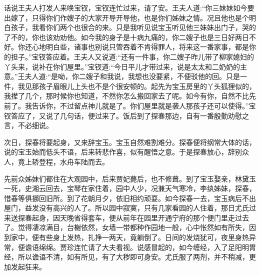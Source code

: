 


\begin{parag}
    话说王夫人打发人来唤宝钗，宝钗连忙过来，请了安。王夫人道:“你三妹妹如今要出嫁了，只得你们作嫂子的大家开导开导他，也是你们姊妹之情。况且他也是个明白孩子，我看你们两个也很合的来。只是我听见说宝玉听见他三妹妹出门子，哭的了不的，你也该劝劝他。如今我的身子是十病九痛的，你二嫂子也是三日好两日不好。你还心地明白些，诸事也别说只管吞着不肯得罪人，将来这一番家事，都是你的担子。”宝钗答应着。王夫人又说道:“还有一件事，你二嫂子昨儿带了柳家媳妇的丫头来，说补在你们屋里。”宝钗道:“今日平儿才带过来，说是太太和二奶奶的主意。”王夫人道:“是呦，你二嫂子和我说，我想也没要紧，不便驳他的回。只是一件，我见那孩子眉眼儿上头也不是个很安顿的。起先为宝玉房里的丫头狐狸似的，我撵了几个，那时候你也知道，不然你怎么搬回家去了呢。如今有你，自然不比先前了。我告诉你，不过留点神儿就是了。你们屋里就是袭人那孩子还可以使得。”宝钗答应了，又说了几句话，便过来了。饭后到了探春那边，自有一番殷勤劝慰之言，不必细说。
\end{parag}


\begin{parag}
    次日，探春将要起身，又来辞宝玉。宝玉自然难割难分。探春便将纲常大体的话，说的宝玉始而低头不语，后来转悲作喜，似有醒悟之意。于是探春放心，辞别众人，竟上轿登程，水舟车陆而去。
\end{parag}


\begin{parag}
    先前众姊妹们都住在大观园中，后来贾妃薨后，也不修葺。到了宝玉娶亲，林黛玉一死，史湘云回去，宝琴在家住着，园中人少，况兼天气寒冷，李纨姊妹，探春，惜春等俱挪回旧所。到了花朝月夕，依旧相约顽耍。如今探春一去，宝玉病后不出屋门，益发没有高兴的人了。所以园中寂寞，只有几家看园的人住着，那日尤氏过来送探春起身，因天晚省得套车，便从前年在园里开通宁府的那个便门里走过去了。觉得凄凉满目，台榭依然，女墙一带都种作园地一般，心中怅然如有所失，因到家中，便有些身上发热，扎挣一两天，竟躺倒了。日间的发烧犹可，夜里身热异常，便谵语绵绵。贾珍连忙请了大夫看视。说感冒起的，如今缠经，入了足阳明胃经，所以谵语不清，如有所见，有了大秽即可身安。尤氏服了两剂，并不稍减，更加发起狂来。
\end{parag}



